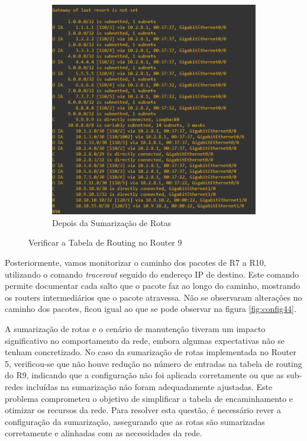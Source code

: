 \documentclass[11pt,english, openright, oneside]{book}
\begin{document}
\begin{figure}[h]
\begin{subfigure}{.49\textwidth}
      \includegraphics[width=.95\linewidth]{imagens/Tarefa5/25.after_show_ip_route_R9.png}
      \caption{Depois da Sumarização de Rotas}
  \end{subfigure}
  \caption{Verificar a Tabela de Routing no Router 9}
  \label{fig:config46}
\end{figure}
\vspace{0.2cm}

\newpage
\par Posteriormente, vamos monitorizar o caminho dos pacotes de R7 a R10, utilizando o comando \textit{tracerout} seguido do endereço IP de destino. Este comando permite documentar cada salto que o pacote faz ao longo do caminho, mostrando os routers intermediários que o pacote atravessa. Não se observaram alterações no caminho dos pacotes, ficou igual ao que se pode observar na figura \ref{fig:config44}.
\vspace{0.2cm}

\par A sumarização de rotas e o cenário de manutenção tiveram um impacto significativo no comportamento da rede, embora algumas expectativas não se tenham concretizado. No caso da sumarização de rotas implementada no Router 5, verificou-se que não houve redução no número de entradas na tabela de routing do R9, indicando que a configuração não foi aplicada corretamente ou que as sub-redes incluídas na sumarização não foram adequadamente ajustadas. Este problema comprometeu o objetivo de simplificar a tabela de encaminhamento e otimizar os recursos da rede. Para resolver esta questão, é necessário rever a configuração da sumarização, assegurando que as rotas são sumarizadas corretamente e alinhadas com as necessidades da rede.
\end{document}
